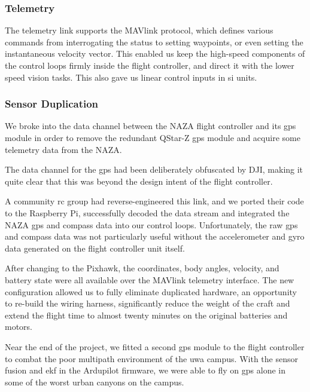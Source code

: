 \documentclass[a4paper, 11pt, titlepage]{article}
\begin{document}
    \subsubsection{Telemetry}
      The telemetry link supports the MAVlink \cite{MAVLink} protocol, which defines various commands from interrogating the status to setting waypoints, or even setting the instantaneous velocity vector.
      This enabled us keep the high-speed components of the control loops firmly inside the flight controller, and direct it with the lower speed vision tasks.  This also gave us linear control inputs in \gls{si} units.

    \subsubsection{Sensor Duplication}
      We broke into the data channel between the NAZA flight controller and its \gls{gps} module in order to remove the redundant QStar-Z \gls{gps} module and acquire some telemetry data from the NAZA.

      The data channel for the \gls{gps} had been deliberately obfuscated by DJI, making it quite clear that this was beyond the design intent of the flight controller.
      
      A community \gls{rc} group had reverse-engineered this link, and we ported their code to the Raspberry Pi, successfully decoded the data stream and integrated the NAZA \gls{gps} and compass data into our control loops.
      Unfortunately, the raw \gls{gps} and compass data was not particularly useful without the accelerometer and gyro data generated on the flight controller unit itself.

      After changing to the Pixhawk, the coordinates, body angles, velocity, and battery state were all available over the MAVlink \cite{MAVLink} telemetry interface.
      The new configuration allowed us to fully eliminate duplicated hardware, an opportunity to re-build the wiring harness, significantly reduce the weight of the craft and extend the flight time to almost twenty minutes on the original batteries and motors.

      Near the end of the project, we fitted a second \gls{gps} module to the flight controller to combat the poor multipath environment of the \gls{uwa} campus.  With the sensor fusion and \gls{ekf} in the Ardupilot firmware, we were able to fly on \gls{gps} alone in some of the worst urban canyons on the campus.
\end{document}
